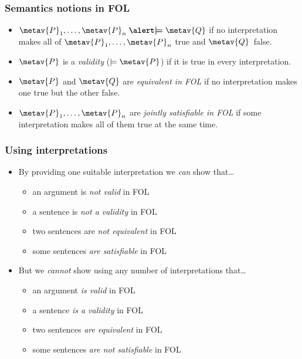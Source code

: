 \begin{frame}
\frametitle{Semantics notions in FOL}

\begin{itemize}[<+->]
  \item $\metav{P}_1,\dots,\metav{P}_n \mathrel{\emph{$\boldsymbol\models$}} \metav{Q}$ if no interpretation
  makes all of $\metav{P}_1,\dots,\metav{P}_n$ true and $\metav{Q}$~false.
  \item $\metav{P}$ is a \emph{validity} ($\models \metav{P}$) if it is true in every interpretation.
  \item $\metav{P}$ and $\metav{Q}$ are \emph{equivalent in FOL} if no
 interpretation makes one true but the other false.
 \item $\metav{P}_1,\dots,\metav{P}_n$ are \emph{jointly satisfiable
 in FOL} if some interpretation makes all of them true at the same time.
\end{itemize}
\end{frame}

\begin{frame}
\frametitle{Using interpretations}

\begin{itemize}[<+->]
\item By providing one suitable interpretation we \emph{can} show that\dots
\begin{itemize}[<+->]
  \item an argument is \emph{not valid} in FOL
  \item a sentence is \emph{not a validity} in FOL
  \item two sentences are \emph{not equivalent} in FOL
  \item some sentences \emph{are satisfiable} in FOL
\end{itemize}
\item But we \emph{cannot} show using any number of interpretations that\dots
\begin{itemize}[<+->]
  \item an argument \emph{is valid} in FOL
  \item a sentence \emph{is a validity} in FOL
  \item two sentences \emph{are equivalent} in FOL
  \item some sentences \emph{are not satisfiable} in FOL
\end{itemize}
\end{itemize}
\end{frame}


